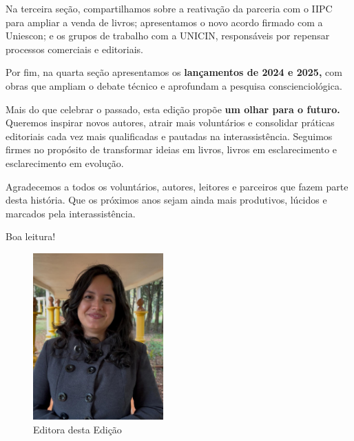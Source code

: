 \documentclass{gescons}
\begin{document}
\begin{multicols}{2}
Na terceira seção, compartilhamos sobre a reativação da parceria com o IIPC para ampliar a venda de livros; apresentamos o novo acordo firmado com a Uniescon; e os grupos de trabalho com a UNICIN, responsáveis por repensar processos comerciais e editoriais.

Por fim, na quarta seção apresentamos os \textbf{lançamentos de 2024 e 2025,} com obras que ampliam o debate técnico e aprofundam a pesquisa conscienciológica.

Mais do que celebrar o passado, esta edição propõe \textbf{um olhar para o futuro.} Queremos inspirar novos autores, atrair mais voluntários e consolidar práticas editoriais cada vez mais qualificadas e pautadas na interassistência. Seguimos firmes no propósito de transformar ideias em livros, livros em esclarecimento e esclarecimento em evolução.

Agradecemos a todos os voluntários, autores, leitores e parceiros que fazem parte desta história. Que os próximos anos sejam ainda mais produtivos, lúcidos e marcados pela interassistência.

Boa leitura!




        
    \end{multicols}

\begin{figure}[h] %
\centering %
\includegraphics[width=5cm,trim={0 200 0 70},clip]{articles/inicial/imagens/Amanda.jpeg}
\caption*{Editora desta Edição} %
\end{figure}
\end{document}
